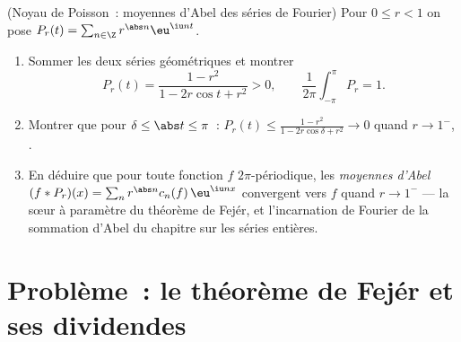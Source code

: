 \begin{exercise}[$\star\star\star$]\label{exo:b2:fourier:12}
(Noyau de Poisson~: moyennes d'Abel des séries de Fourier) Pour $0
\leq r < 1$ on pose $P_r(t) = \sum_{n\in\Z} r^{\abs n}\eu^{\iu nt}$.
\begin{enumerate}
  \item Sommer les deux séries géométriques et montrer
        \[
        P_r(t) = \frac{1 - r^2}{1 - 2r\cos t + r^2} > 0,
        \qquad
        \frac{1}{2\pi}\int_{-\pi}^{\pi}P_r = 1 .
        \]
  \item Montrer que pour $\delta \leq \abs t \leq \pi$~: $P_r(t)
        \leq \frac{1 - r^2}{1 - 2r\cos\delta + r^2} \to 0$ quand
        $r \to 1^-$, .
  \item En déduire que pour toute fonction $f$ 
        $2\pi$-périodique, les \emph{moyennes d'Abel} $(f *
        P_r)(x) = \sum_n r^{\abs n}c_n(f)\,\eu^{\iu nx}$ convergent
        vers $f$  quand $r \to 1^-$ --- la sœur à
        paramètre  du théorème de Fejér, et l'incarnation de
        Fourier de la sommation d'Abel du chapitre sur les séries
        entières.
\end{enumerate}
\end{exercise}

\section{Problème~: le théorème de Fejér et ses dividendes}

